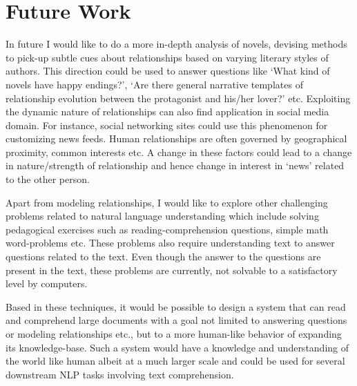 \documentclass[9.8pt, twocolumn]{article}
\begin{document}
\section{Future Work}
In future I would like to do a more in-depth analysis of novels, devising methods to pick-up subtle cues about relationships based on varying literary styles of authors. This direction could be used to answer questions like `What kind of novels have happy endings?', `Are there general narrative templates of relationship evolution between the protagonist and his/her lover?' etc. Exploiting the dynamic nature of relationships can also find application in social media domain. For instance, social networking sites could use this phenomenon  for customizing news feeds. Human relationships are often governed by geographical proximity, common interests etc. A change in these factors could lead to a change in nature/strength of relationship and hence change in interest in `news' related to the other person.

Apart from modeling relationships, I would like to explore other challenging problems related to natural language understanding which include solving pedagogical exercises such as reading-comprehension questions, simple math word-problems etc. These problems also require understanding text to answer questions related to the text. Even though the answer to the questions are present in the text, these problems are currently, not solvable to a satisfactory level by computers.

Based in these techniques, it would be possible to design a system that can read and comprehend large documents with a goal not limited to answering questions or modeling relationships etc., but to a more human-like behavior of expanding its knowledge-base. Such a system would have a knowledge and understanding of the world like human albeit at a much larger scale and could be used for several downstream NLP tasks involving text comprehension.
\end{document}
